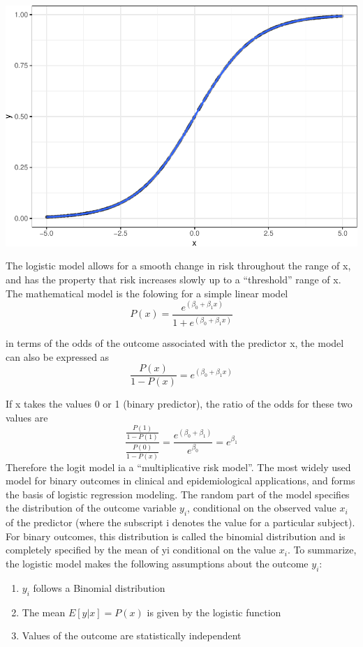 \documentclass[
]{article}
\providecommand{\tightlist}{%
  \setlength{\itemsep}{0pt}\setlength{\parskip}{0pt}}
\begin{document}
\includegraphics{LogisticRegressionCh5_files/figure-latex/unnamed-chunk-7-1.pdf}

The logistic model allows for a smooth change in risk throughout the
range of x, and has the property that risk increases slowly up to a
``threshold'' range of x. The mathematical model is the folowing for a
simple linear model
\[P(x) = \frac{e^{(\beta_0 + \beta_1x)}}{1+e^{(\beta_0 + \beta_1 x)}}\]

in terms of the odds of the outcome associated with the predictor x, the
model can also be expressed as
\[\frac{P(x)}{1-P(x)} = e^{(\beta_0 + \beta_1 x)}\]

If x takes the values 0 or 1 (binary predictor), the ratio of the odds
for these two values are
\[\frac{\frac{P(1)}{1-P(1)}}{\frac{P(0)}{1-P(x)}} = \frac{e^{(\beta_0 + \beta_1)}}{e^{\beta_0}} = e^{\beta_1}\]
Therefore the logit model ia a ``multiplicative risk model''. The most
widely used model for binary outcomes in clinical and epidemiological
applications, and forms the basis of logistic regression modeling. The
random part of the model specifies the distribution of the outcome
variable \(y_i\), conditional on the observed value \(x_i\) of the
predictor (where the subscript i denotes the value for a particular
subject). For binary outcomes, this distribution is called the binomial
distribution and is completely specified by the mean of yi conditional
on the value \(x_i\). To summarize, the logistic model makes the
following assumptions about the outcome \(y_i\):

\begin{enumerate}
\def\labelenumi{\arabic{enumi}.}
\tightlist
\item
  \(y_i\) follows a Binomial distribution
\item
  The mean \(E[y|x] = P(x)\) is given by the logistic function
\item
  Values of the outcome are statistically independent
\end{enumerate}
\end{document}
